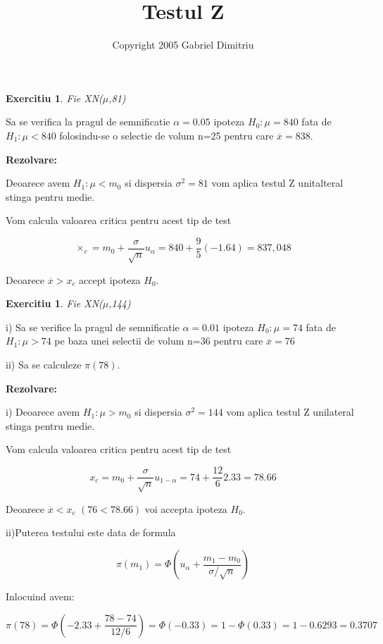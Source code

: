 \documentclass{article}
\newtheorem{exercise}[theorem]{Exercitiu}
\begin{document}
\title{Testul Z}
\author{Copyright 2005 Gabriel Dimitriu}
\maketitle

\begin{exercise}
Fie XN($\mu $,81)
\end{exercise}

Sa se verifica la pragul de semnificatie $\alpha =0.05$ ipoteza $H_{0}:\mu
=840$ fata de $H_{1}:\mu <840$ folosindu-se o selectie de volum n=25 pentru
care $\overline{x}=838$.

\textbf{Rezolvare:}

Deoarece avem $H_{1}:\mu <m_{0}$ si dispersia $\sigma ^{2}=81$ vom aplica
testul Z unitalteral stinga pentru medie.

Vom calcula valoarea critica pentru acest tip de test

\[
\times _{c}=m_{0}+\frac{\sigma }{\sqrt{n}}u_{\alpha }=840+\frac{9}{5}%
(-1.64)=837,048 
\]

Deoarece $\overline{x}>x_{c}$ accept ipoteza $H_{0}$.

\begin{exercise}
Fie XN($\mu $,144)
\end{exercise}

i) Sa se verifice la pragul de semnificatie $\alpha =0.01$ ipoteza $%
H_{0}:\mu =74$ fata de $H_{1}:\mu >74$ pe baza unei selectii de volum n=36
pentru care $\overline{x}=76$

ii) Sa se calculeze $\pi (78)$.

\textbf{Rezolvare:}

i) Deoarece avem $H_{1}:\mu >m_{0}$ si dispersia $\sigma ^{2}=144$ vom
aplica testul Z unilateral stinga pentru medie.

Vom calcula valoarea critica pentru acest tip de test

\[
x_{c}=m_{0}+\frac{\sigma }{\sqrt{n}}u_{1-\alpha }=74+\frac{12}{6}2.33=78.66 
\]

Deoarece $\overline{x}<x_{c}$ $(76<78.66)$ voi accepta ipoteza $H_{0}$.

ii)Puterea testului este data de formula

\[
\pi (m_{1})=\Phi \left( u_{\alpha }+\frac{m_{1}-m_{0}}{\sigma /\sqrt{n}}%
\right) 
\]

Inlocuind avem:

\[
\pi (78)=\Phi (-2.33+\frac{78-74}{12/6})=\Phi (-0.33)=1-\Phi
(0.33)=1-0.6293=0.3707 
\]
\end{document}
